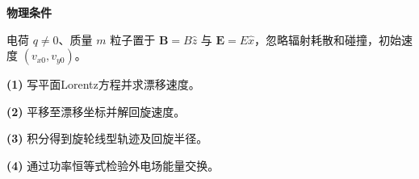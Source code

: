 \textbf{物理条件}\par 电荷 \(q\ne0\)、质量 \(m\) 粒子置于 \(\boldsymbol B=B\hat z\) 与 \(\boldsymbol E=E\hat x\)，忽略辐射耗散和碰撞，初始速度 \((v_{x0},v_{y0})\)。
\par\noindent\textbf{(1)} 写平面Lorentz方程并求漂移速度。
\par\noindent\textbf{(2)} 平移至漂移坐标并解回旋速度。
\par\noindent\textbf{(3)} 积分得到旋轮线型轨迹及回旋半径。
\par\noindent\textbf{(4)} 通过功率恒等式检验外电场能量交换。
